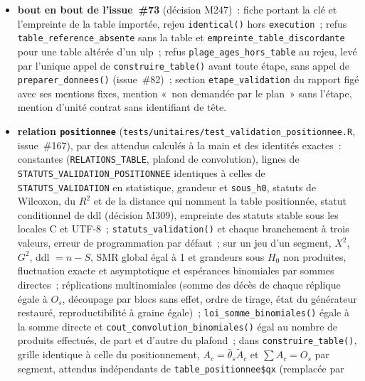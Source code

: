 \documentclass[a4paper,11pt]{article}
\newcommand{\code}[1]{\texttt{\small #1}}
\begin{document}
{\begin{itemize}[leftmargin=*, itemsep=2pt]
    \code{monte\_carlo} de l'étape dans \code{construire\_table()}~;
    sous-groupes dont les $O$ somment au $O$ global~; appariement
    \code{ensemble\_par\_sexe}~; \code{par\_annee = TRUE} (séquences sexe
    $\times$ année, SMR égal au cas sans année)~;
    \code{ajustee\_hors\_outil} dans \code{construire\_table()}~;
  \item \textbf{bout en bout de l'issue~\#73} (décision M247)~: fiche
    portant la clé et l'empreinte de la table importée, rejeu
    \code{identical()} hors \code{execution}~; refus
    \code{table\_reference\_absente} sans la table et
    \code{empreinte\_table\_discordante} pour une table altérée d'un ulp~;
    refus \code{plage\_ages\_hors\_table} au rejeu, levé par l'unique
    appel de \code{construire\_table()} avant toute étape, sans appel de
    \code{preparer\_donnees()} (issue~\#82)~; section \code{etape\_validation} du
    rapport figé avec ses mentions fixes, mention «~non demandée par le
    plan~» sans l'étape, mention d'unité contrat sans identifiant de tête.
  \item \textbf{relation \code{positionnee}}
    (\code{tests/unitaires/test\_validation\_positionnee.R}, issue~\#167),
    par des attendus calculés à la main et des identités exactes~:
    constantes (\code{RELATIONS\_TABLE}, plafond de convolution), lignes de
    \code{STATUTS\_VALIDATION\_POSITIONNEE} identiques à celles de
    \code{STATUTS\_VALIDATION} en statistique, grandeur et \code{sous\_h0},
    statuts de Wilcoxon, du $R^2$ et de la distance qui nomment la table
    positionnée, statut conditionnel de ddl (décision M309), empreinte des
    statuts stable sous les locales C et UTF-8~; \code{statuts\_validation()}
    et chaque branchement à trois valeurs, erreur de programmation par
    défaut~; sur un jeu d'un segment, $X^2$, $G^2$, ddl $= n - S$, SMR
    global égal à 1 et grandeurs sous $H_0$ non produites, fluctuation
    exacte et asymptotique et espérances binomiales par sommes directes~;
    réplications multinomiales (somme des décès de chaque réplique égale à
    $O_s$, découpage par blocs sans effet, ordre de tirage, état du
    générateur restauré, reproductibilité à graine égale)~;
    \code{loi\_somme\_binomiales()} égale à la somme directe et
    \code{cout\_convolution\_binomiales()} égal au nombre de produits
    effectués, de part et d'autre du plafond~; dans
    \code{construire\_table()}, grille identique à celle du positionnement,
    $A_c = \hat\theta_s \tilde A_c$ et $\sum A_c = O_s$ par segment,
    attendus indépendants de \code{table\_positionnee\$qx} (remplacée par

\end{itemize}}
\end{document}
